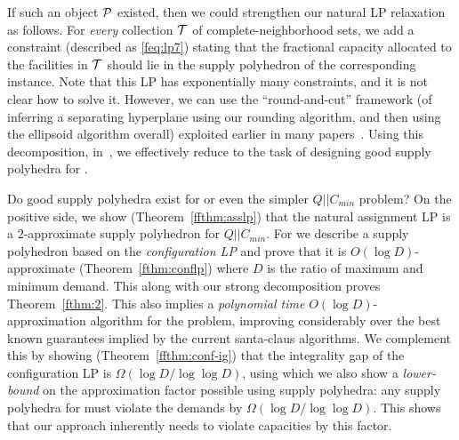  If such an object ${\cal P}$ existed, then we could strengthen our natural LP relaxation as follows. For {\em every} collection ${\cal T}$ of complete-neighborhood sets, we add a constraint (described as \eqref{feq:lp7}) stating that the fractional capacity allocated to the facilities in ${\cal T}$ should
 lie in the supply polyhedron of the corresponding \cckp instance. Note that this LP has exponentially many constraints, and it is not clear how to solve it. However, we can use the ``round-and-cut'' framework (of inferring a separating hyperplane using our rounding algorithm, and then using the ellipsoid algorithm overall) exploited earlier in many papers~\cite{CarrFLP00,ChakrabartyCKK11,AnSS14,DemirciL16,Li15,Li16}.
 Using this decomposition, in~, we effectively reduce \mckc to the task of designing good supply polyhedra for \cckp.

\medskip {}
Do good supply polyhedra exist for \cckp or even the simpler $Q||C_{min} $ problem?
On the positive side, we show (Theorem~\ref{ffthm:asslp}) that the natural assignment LP is a $2$-approximate supply polyhedron for $Q||C_{min}$. For \cckp we describe a supply polyhedron based on the {\em configuration LP} and prove that it is $O(\log D)$-approximate (Theorem~\ref{fthm:conflp}) where $D$ is the ratio of maximum and minimum demand. This along with our strong decomposition proves Theorem~\ref{fthm:2}. This also implies a {\em polynomial time} $O(\log D)$-approximation algorithm for the \cckp problem, improving considerably over the best known guarantees implied by the current santa-claus algorithms. %
We complement this by showing (Theorem~\ref{ffthm:conf-ig}) that the integrality gap of the configuration LP is $\Omega(\log D/\log\log D)$, using which we also show a \emph{lower-bound} on the approximation factor possible using supply polyhedra: any supply polyhedra for \cckp must violate the demands by $\Omega(\log D/\log \log D)$. This shows that our approach inherently needs to violate capacities by this factor.

